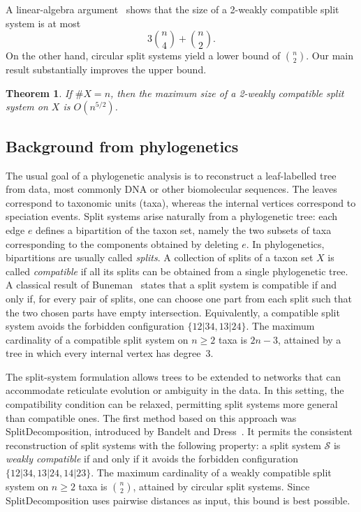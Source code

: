 \documentclass[11pt]{article}
\newtheorem{theorem}{Theorem}
\newcommand{\cS}{\mathcal{S}}
\begin{document}
	A linear-algebra argument~\cite{YangGrunewaldWan2013} shows that the size of a 2-weakly compatible split system is at most
	\[
	3\binom{n}{4}+\binom{n}{2}.
	\]
	On the other hand, circular split systems yield a lower bound of $\binom{n}{2}$. Our main result substantially improves the upper bound.
	
	\begin{theorem}\label{thm:main}
		If $\#X=n$, then the maximum size of a 2-weakly compatible split system on $X$ is $O(n^{5/2})$.
	\end{theorem}
	
	\subsection{Background from phylogenetics}
	
	The usual goal of a phylogenetic analysis is to reconstruct a leaf-labelled tree from data, most commonly DNA or other biomolecular sequences. The leaves correspond to taxonomic units (taxa), whereas the internal vertices correspond to speciation events. Split systems arise naturally from a phylogenetic tree: each edge $e$ defines a bipartition of the taxon set, namely the two subsets of taxa corresponding to the components obtained by deleting $e$. In phylogenetics, bipartitions are usually called \emph{splits}. A collection of splits of a taxon set $X$ is called \emph{compatible} if all its splits can be obtained from a single phylogenetic tree. A classical result of Buneman~\cite{Buneman1971} states that a split system is compatible if and only if, for every pair of splits, one can choose one part from each split such that the two chosen parts have empty intersection. Equivalently, a compatible split system avoids the forbidden configuration $\{12|34,13|24\}$. The maximum cardinality of a compatible split system on $n\ge 2$ taxa is $2n-3$, attained by a tree in which every internal vertex has degree~3.
	
	The split-system formulation allows trees to be extended to networks that can accommodate reticulate evolution or ambiguity in the data. In this setting, the compatibility condition can be relaxed, permitting split systems more general than compatible ones. The first method based on this approach was SplitDecomposition, introduced by Bandelt and Dress~\cite{BandeltDress1992}. It permits the consistent reconstruction of split systems with the following property: a split system $\cS$ is \emph{weakly compatible} if and only if it avoids the forbidden configuration $\{12|34,13|24,14|23\}$. The maximum cardinality of a weakly compatible split system on $n\ge 2$ taxa is $\binom{n}{2}$, attained by circular split systems. Since SplitDecomposition uses pairwise distances as input, this bound is best possible.
	
\end{document}
